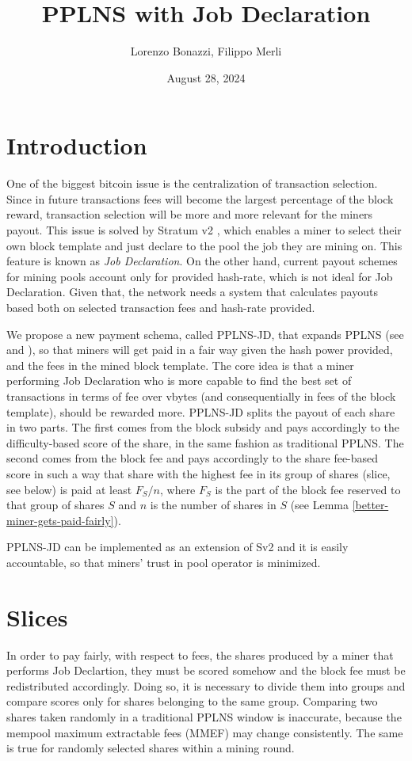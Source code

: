 \documentclass[10pt]{article}
\title{PPLNS with Job Declaration}
\author{Lorenzo Bonazzi, Filippo Merli}
\date{August 28, 2024} %
\begin{document}
\maketitle

\section{Introduction}


One of the biggest bitcoin issue is the centralization of transaction selection. Since in future transactions fees will become the largest percentage of the block reward, transaction selection will be more and more relevant for the miners payout. This issue is solved by Stratum v2 \cite{sv2}, which enables a miner to select their own block template and just declare to the pool the job they are mining on. This feature is known as \emph{Job Declaration}.  On the other hand, current payout schemes for mining pools account only for provided hash-rate, which is not ideal for Job Declaration.  Given that, the network needs a system that calculates payouts based both on selected transaction fees and hash-rate provided. 

We propose a new payment schema, called PPLNS-JD, that expands PPLNS (see \cite{rosenfeld} and \cite{ocean}), so that miners will get paid in a fair way given the hash power provided, and the fees in the mined block template. The core idea is that a miner performing Job Declaration who is more capable to find the best set of transactions in terms of fee over vbytes (and consequentially in fees of the block template), should be rewarded more. PPLNS-JD splits the payout of each share in two parts. The first comes from the block subsidy and pays accordingly to the difficulty-based score of the share, in the same fashion as traditional PPLNS. The second comes from the block fee and pays accordingly to the share fee-based score in such a way that share with the highest fee in its group of shares (slice, see below) is paid at least $F_S/n$, where $F_S$ is the part of the block fee reserved to that group of shares $S$ and $n$ is the number of shares in $S$ (see Lemma \ref{better-miner-gets-paid-fairly}). 

PPLNS-JD can be implemented as an extension of Sv2 \cite{extension} and it is easily accountable, so that miners' trust in pool operator is minimized. 


\section{Slices}
In order to pay fairly, with respect to fees, the shares produced by a miner that performs Job Declartion, they must be scored somehow and the block fee must be redistributed accordingly. Doing so, it is necessary to divide them into groups and compare scores only for shares belonging to the same group. Comparing two shares taken randomly in a traditional PPLNS window is inaccurate, because the mempool maximum extractable fees (MMEF) may change consistently. The same is true for randomly selected shares within a mining round.
\end{document}
